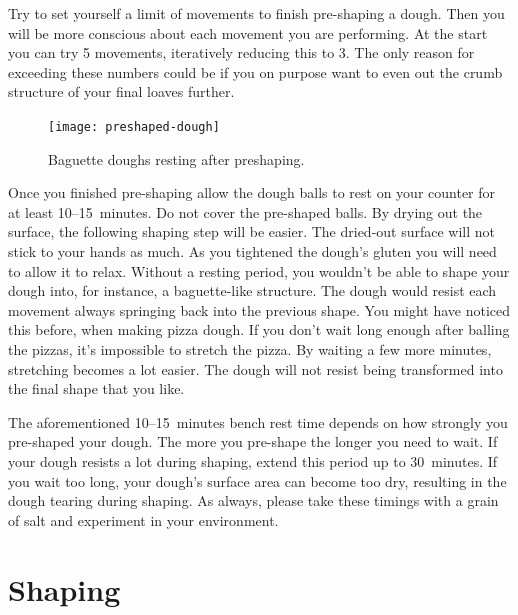 Try to set yourself a limit of movements to finish pre-shaping
a dough. Then you will be more conscious about each movement
you are performing. At the start you can try 5 movements,
iteratively reducing this to 3. The only reason for exceeding these
numbers could be if you on purpose want to even out the crumb
structure of your final loaves further.

\begin{figure}[!htb]
  \texttt{[image: preshaped-dough]}
  \caption{Baguette doughs resting after preshaping.}%
  \label{fig:dough-after-preshaping}
\end{figure}

Once you finished pre-shaping allow the dough balls to rest
on your counter for at least 10--15~minutes. Do not
cover the pre-shaped balls. By drying out the surface,
the following shaping step will be easier. The dried-out surface
will not stick to your hands as much. As
you tightened the dough's gluten you will need to
allow it to relax. Without a resting period, you wouldn't
be able to shape your dough into, for instance, a baguette-like structure.
The dough would resist each movement
always springing back into the previous shape. You
might have noticed this before, when making pizza dough. If you
don't wait long enough after balling the pizzas, it's impossible
to stretch the pizza. By waiting a few more minutes,
stretching becomes a lot easier. The dough will not resist
being transformed into the final shape that you like.

The aforementioned 10--15~minutes bench rest time depends
on how strongly you pre-shaped your dough. The more
you pre-shape the longer you need to wait. If your dough
resists a lot during shaping, extend this period up to 30~minutes.
If you wait too long, your dough's surface area can become too dry,
resulting in the dough tearing during shaping. As always, please
take these timings with a grain of salt and experiment in
your environment.

\section{Shaping}

\begin{flowchart}[!htb]
\begin{center}
  
  \caption[Sourdough shaping process]{A schematic visualization of the shaping process
      including checks for an overfermented dough.}%
  \label{fig:shaping-decision-tree}
\end{center}
\end{flowchart}

